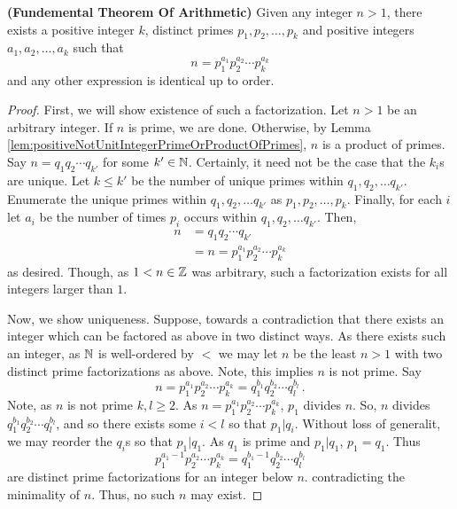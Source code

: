 \guard








\begin{thm}
\label{thm:fundementalTheoremOfArithmetic}
  \textbf{(Fundemental Theorem Of Arithmetic)}
  Given any integer $n>1$, there exists a positive integer $k$, distinct primes $p_1,p_2,\dots,p_k$ and positive integers $a_1,a_2,\dots,a_k$ such that \[ n=p_1^{a_1}p_2^{a_2}\cdots p_k^{a_k}\] and any other expression is identical up to order.
\end{thm}
\begin{proof}
  First, we will show existence of such a factorization.
  Let $n>1$ be an arbitrary integer.
  If $n$ is prime, we are done.
  Otherwise, by Lemma \ref{lem:positiveNotUnitIntegerPrimeOrProductOfPrimes}, $n$ is a product of primes.
  Say $n = q_1q_2\cdots q_{k'}$ for some $k'\in\mathbb{N}$.
  Certainly, it need not be the case that the $k_i$s are unique.
  Let $k\leq k'$ be the number of unique primes within $q_1,q_2,\dots q_{k'}$.
  Enumerate the unique primes within $q_1,q_2,\dots q_{k'}$ as $p_1,p_2,\dots,p_k$.
  Finally, for each $i$ let $a_i$ be the number of times $p_i$ occurs within  $q_1,q_2,\dots q_{k'}$.
  Then,
  \begin{align*}
    n &= q_1q_2\cdots q_{k'} \\
      &= n=p_1^{a_1}p_2^{a_2}\cdots p_k^{a_k}
  \end{align*}
  as desired.
  Though, as $1<n\in\mathbb{Z}$ was arbitrary, such a factorization exists for all integers larger than $1$.


  Now, we show uniqueness.
  Suppose, towards a contradiction that there exists an integer which can be factored as above in two distinct ways.
  As there exists such an integer, as $\mathbb{N}$ is well-ordered by $<$ we may let $n$ be the least $n>1$ with two distinct prime factorizations as above.
  Note, this implies $n$ is not prime.
  Say \[n=p_1^{a_1}p_2^{a_2}\cdots p_k^{a_k} =q_1^{b_1}q_2^{b_2}\cdots q_l^{b_l}\,.\]
  Note, as $n$ is not prime $k,l\geq 2$.
  As $n=p_1^{a_1}p_2^{a_2}\cdots p_k^{a_k}$, $p_1$ divides $n$.
  So, $n$ divides $q_1^{b_1}q_2^{b_2}\cdots q_l^{b_l}$, and so there exists some $i<l$ so that $p_1\vert q_i$.
  Without loss of generalit, we may reorder the $q_i$s so that $p_1\vert q_1$.
  As $q_1$ is prime and $p_1\vert q_1$, $p_1=q_1$.
  Thus \[ p_1^{a_1-1}p_2^{a_2}\cdots p_k^{a_k} = q_1^{b_1-1}q_2^{b_2}\cdots q_l^{b_l}\] are distinct prime factorizations for an integer below $n$. contradicting the minimality of $n$.
  Thus, no such $n$ may exist.
\end{proof}
